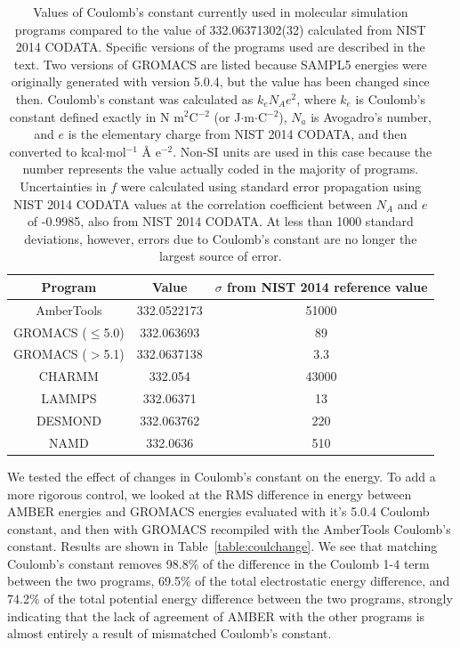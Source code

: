 \begin{table}
\caption{Values of Coulomb's constant currently used in molecular
  simulation programs compared to the value of 332.06371302(32)
  calculated from NIST 2014 CODATA.  Specific versions of the programs
  used are described in the text. Two versions of GROMACS are listed
  because SAMPL5 energies were originally generated with version
  5.0.4, but the value has been changed since then. Coulomb's constant
  was calculated as $k_e N_A e^2$, where $k_e$ is Coulomb's constant
  defined exactly in N m$^2$C$^{-2}$ (or J$\cdot$m$\cdot$C$^{-2}$),
  $N_a$ is Avogadro's number, and $e$ is the elementary charge from
  NIST 2014 CODATA, and then converted to kcal$\cdot$mol$^{-1}$ \AA
  e$^{-2}$. Non-SI units are used in this case because the number
  represents the value actually coded in the majority of programs.
  Uncertainties in $f$ were calculated using standard error
  propagation using NIST 2014 CODATA values at the correlation
  coefficient between $N_A$ and $e$ of -0.9985, also from NIST 2014
  CODATA. At less than 1000 standard deviations, however, errors due
  to Coulomb's constant are no longer the largest source of
  error.\label{tab:delfromnist}}
\begin{center}
\begin{tabular}{|ccc|}
\hline
Program & Value & $\sigma$ from NIST 2014 reference value \\
\hline
AmberTools &  332.0522173 & 51000 \\
GROMACS ($\leq$5.0) & 332.063693 & 89 \\
GROMACS ($>$5.1) & 332.0637138 & 3.3 \\ 
CHARMM & 332.054 & 43000 \\
LAMMPS & 332.06371 &  13 \\
DESMOND & 332.063762 & 220 \\
NAMD & 332.0636 & 510 \\
\hline
\end{tabular}
\end{center}
\end{table}

We tested the effect of changes in Coulomb's constant on the energy.
To add a more rigorous control, we looked at the RMS difference in
energy between AMBER energies and GROMACS energies evaluated with it's
5.0.4 Coulomb constant, and then with GROMACS recompiled with the
AmberTools Coulomb's constant.  Results are shown in
Table~\ref{table:coulchange}. We see that matching Coulomb's constant
removes 98.8\% of the difference in the Coulomb 1-4 term between the
two programs, 69.5\% of the total electrostatic energy difference, and
74.2\% of the total potential energy difference between the two
programs, strongly indicating that the lack of agreement of AMBER with
the other programs is almost entirely a result of mismatched Coulomb's constant.


